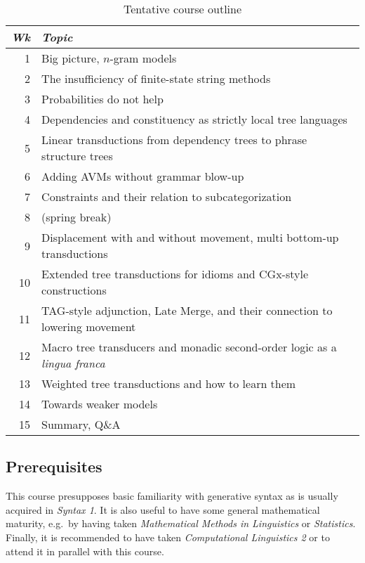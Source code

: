 \begin{table}
    \centering
    \begin{tabular}{rl}
        \toprule
        \emph{Wk} & \emph{Topic} \\
        \toprule
        1         & Big picture, $n$-gram models\\
        2         & The insufficiency of finite-state string methods\\
        3         & Probabilities do not help\\
        4         & Dependencies and constituency as strictly local tree languages\\
        5         & Linear transductions from dependency trees to phrase structure trees\\
        6         & Adding AVMs without grammar blow-up\\
        7         & Constraints and their relation to subcategorization\\
        \midrule
        8         & (spring break)\\
        \midrule
        9         & Displacement with and without movement, multi bottom-up transductions\\
        10        & Extended tree transductions for idioms and CGx-style constructions\\
        11        & TAG-style adjunction, Late Merge, and their connection to lowering movement\\
        12        & Macro tree transducers and monadic second-order logic as a \emph{lingua franca}\\
        13        & Weighted tree transductions and how to learn them\\
        14        & Towards weaker models\\
        15        & Summary, Q\&A\\
        \bottomrule
    \end{tabular}
\caption{Tentative course outline}
\end{table}

\subsection{Prerequisites}

This course presupposes basic familiarity with generative syntax as is usually acquired in \emph{Syntax 1}.
It is also useful to have some general mathematical maturity, e.g.\ by having taken \emph{Mathematical Methods in Linguistics} or \emph{Statistics}.
Finally, it is recommended to have taken \emph{Computational Linguistics 2} or to attend it in parallel with this course.


